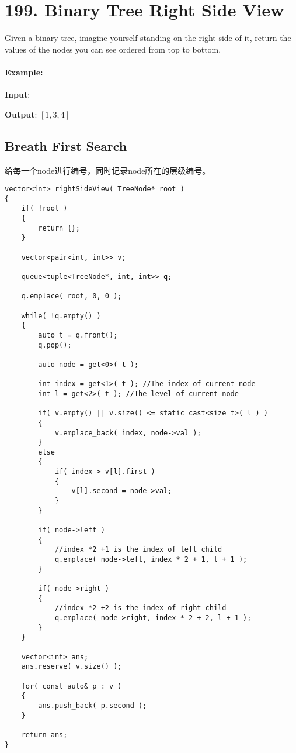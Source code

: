 \section{199. Binary Tree Right Side View}
Given a binary tree, imagine yourself standing on the right side of it, return the values of the nodes you can see ordered from top to bottom.
\paragraph{Example:}
\begin{flushleft}
\textbf{Input}:
\begin{figure}[H]
\end{figure}
\textbf{Output}: $[1,3,4]$
\end{flushleft}
\subsection{Breath First Search}
给每一个node进行编号，同时记录node所在的层级编号。
\begin{lstlisting}[style=customc]
vector<int> rightSideView( TreeNode* root )
{
    if( !root )
    {
        return {};
    }

    vector<pair<int, int>> v;

    queue<tuple<TreeNode*, int, int>> q;

    q.emplace( root, 0, 0 );

    while( !q.empty() )
    {
        auto t = q.front();
        q.pop();

        auto node = get<0>( t );

        int index = get<1>( t ); //The index of current node
        int l = get<2>( t ); //The level of current node

        if( v.empty() || v.size() <= static_cast<size_t>( l ) )
        {
            v.emplace_back( index, node->val );
        }
        else
        {
            if( index > v[l].first )
            {
                v[l].second = node->val;
            }
        }

        if( node->left )
        {
            //index *2 +1 is the index of left child
            q.emplace( node->left, index * 2 + 1, l + 1 );
        }

        if( node->right )
        {
            //index *2 +2 is the index of right child
            q.emplace( node->right, index * 2 + 2, l + 1 );
        }
    }

    vector<int> ans;
    ans.reserve( v.size() );

    for( const auto& p : v )
    {
        ans.push_back( p.second );
    }

    return ans;
}
\end{lstlisting}